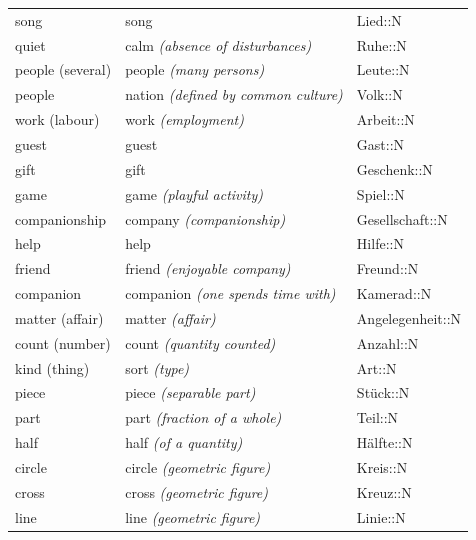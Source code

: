 \begin{center}
\begin{longtable}{lll}
{\sc \lowercase{	SONG	}}	&	song		&	Lied::N	\\
{\sc \lowercase{	QUIET	}}	&	calm	\textit{\footnotesize (absence of disturbances)}	&	Ruhe::N	\\
{\sc \lowercase{	PEOPLE \footnotesize (SEVERAL)	}}	&	people	\textit{\footnotesize (many persons)}	&	Leute::N	\\
{\sc \lowercase{	PEOPLE	}}	&	nation	\textit{\footnotesize (defined by common culture)}	&	Volk::N	\\
{\sc \lowercase{	WORK \footnotesize (LABOUR)	}}	&	work	\textit{\footnotesize (employment)}	&	Arbeit::N	\\
{\sc \lowercase{	GUEST	}}	&	guest		&	Gast::N	\\
{\sc \lowercase{	GIFT	}}	&	gift		&	Geschenk::N	\\
{\sc \lowercase{	GAME	}}	&	game	\textit{\footnotesize (playful activity)}	&	Spiel::N	\\
{\sc \lowercase{	COMPANIONSHIP	}}	&	company	\textit{\footnotesize (companionship)}	&	Gesellschaft::N	\\
{\sc \lowercase{	HELP	}}	&	help		&	Hilfe::N	\\
{\sc \lowercase{	FRIEND	}}	&	friend	\textit{\footnotesize (enjoyable company)}	&	Freund::N	\\
{\sc \lowercase{	COMPANION	}}	&	companion	\textit{\footnotesize (one spends time with)}	&	Kamerad::N	\\
{\sc \lowercase{	MATTER \footnotesize (AFFAIR)	}}	&	matter	\textit{\footnotesize (affair)}	&	Angelegenheit::N	\\
{\sc \lowercase{	COUNT \footnotesize (NUMBER)	}}	&	count	\textit{\footnotesize (quantity counted)}	&	Anzahl::N	\\
{\sc \lowercase{	KIND \footnotesize (THING)	}}	&	sort	\textit{\footnotesize (type)}	&	Art::N	\\
{\sc \lowercase{	PIECE	}}	&	piece	\textit{\footnotesize (separable part)}	&	Stück::N	\\
{\sc \lowercase{	PART	}}	&	part	\textit{\footnotesize (fraction of a whole)}	&	Teil::N	\\
{\sc \lowercase{	HALF	}}	&	half	\textit{\footnotesize (of a quantity)}	&	Hälfte::N	\\
{\sc \lowercase{	CIRCLE	}}	&	circle	\textit{\footnotesize (geometric figure)}	&	Kreis::N	\\
{\sc \lowercase{	CROSS	}}	&	cross	\textit{\footnotesize (geometric figure)}	&	Kreuz::N	\\
{\sc \lowercase{	LINE	}}	&	line	\textit{\footnotesize (geometric figure)}	&	Linie::N	\\

\end{longtable}
\end{center}

